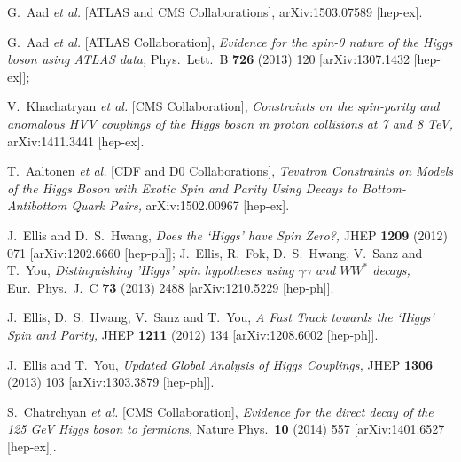 \documentclass[12pt]{article}
\numberwithin{equation}{section}
\begin{document}
\begin{thebibliography}{99}
 G.~Aad {\it et al.}  [ATLAS and CMS Collaborations],
  arXiv:1503.07589 [hep-ex].

G.~Aad {\it et al.}  [ATLAS Collaboration],
{\it Evidence for the spin-0 nature of the Higgs boson using ATLAS data,}
  Phys.\ Lett.\ B {\bf 726} (2013) 120
  [arXiv:1307.1432 [hep-ex]];

V.~Khachatryan {\it et al.}  [CMS Collaboration],
{\it Constraints on the spin-parity and anomalous HVV couplings of the Higgs boson in proton collisions at 7 and 8 TeV,}
  arXiv:1411.3441 [hep-ex].

 T.~Aaltonen {\it et al.}  [CDF and D0 Collaborations],
{\it Tevatron Constraints on Models of the Higgs Boson with Exotic Spin and Parity Using Decays to Bottom-Antibottom Quark Pairs,}
  arXiv:1502.00967 [hep-ex].
  
J.~Ellis and D.~S.~Hwang,
{\it Does the `Higgs' have Spin Zero?,}
  JHEP {\bf 1209} (2012) 071
  [arXiv:1202.6660 [hep-ph]];
 J.~Ellis, R.~Fok, D.~S.~Hwang, V.~Sanz and T.~You,
 {\it Distinguishing 'Higgs' spin hypotheses using $\gamma \gamma$ and $W W^*$ decays,}
  Eur.\ Phys.\ J.\ C {\bf 73} (2013) 2488
  [arXiv:1210.5229 [hep-ph]].
  
   J.~Ellis, D.~S.~Hwang, V.~Sanz and T.~You,
 {\it A Fast Track towards the `Higgs' Spin and Parity,}
  JHEP {\bf 1211} (2012) 134
  [arXiv:1208.6002 [hep-ph]].
  
J.~Ellis and T.~You,
{\it Updated Global Analysis of Higgs Couplings,}
  JHEP {\bf 1306} (2013) 103
  [arXiv:1303.3879 [hep-ph]].

S.~Chatrchyan {\it et al.}  [CMS Collaboration],
{\it Evidence for the direct decay of the 125 GeV Higgs boson to fermions},
  Nature Phys.\  {\bf 10} (2014) 557
  [arXiv:1401.6527 [hep-ex]].
  

\end{thebibliography}
\end{document}
